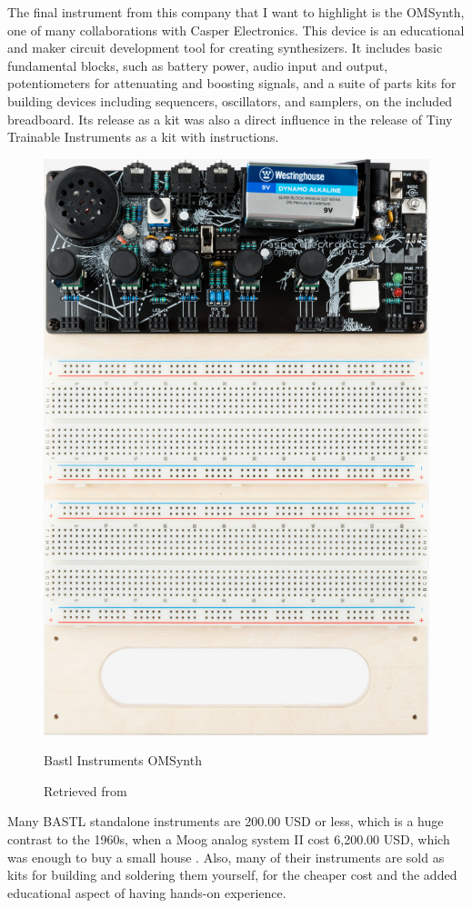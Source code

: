 The final instrument from this company that I want to highlight is the OMSynth, one of many collaborations with Casper Electronics. This device is an educational and maker circuit development tool for creating synthesizers. It includes basic fundamental blocks, such as battery power, audio input and output, potentiometers for attenuating and boosting signals, and a suite of parts kits for building devices including sequencers, oscillators, and samplers, on the included breadboard. Its release as a kit was also a direct influence in the release of Tiny Trainable Instruments as a kit with instructions.

\begin{figure}[ht]
  \centering
  \includegraphics[width=0.75\linewidth,height=0.25\textheight,keepaspectratio]{images/bastl-omsynth.jpg}
  \caption{Bastl Instruments OMSynth}
  \caption*{Retrieved from \cite{website-bastl-instruments-current}}
  \label{fig:bastl-omsynth}
\end{figure}

Many BASTL standalone instruments are 200.00 USD or less, which is a huge contrast to the 1960s, when a Moog analog system II cost 6,200.00 USD, which was enough to buy a small house \cite{analog-days}. Also, many of their instruments are sold as kits for building and soldering them yourself, for the cheaper cost and the added educational aspect of having hands-on experience.

